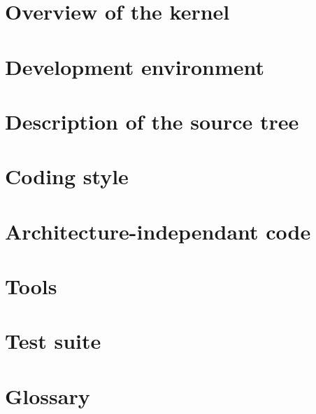 \documentclass[12pt,a4wide]{report}
\begin{document}
%
%

\chapter{Overview of the kernel}

%
%

\chapter{Development environment}

%
%

\chapter{Description of the source tree}

%
%

\chapter{Coding style}

%
%

\chapter{Architecture-independant code}

%
%

\chapter{Tools}

%
%

\chapter{Test suite}

%
%

\chapter{Glossary}
\end{document}
